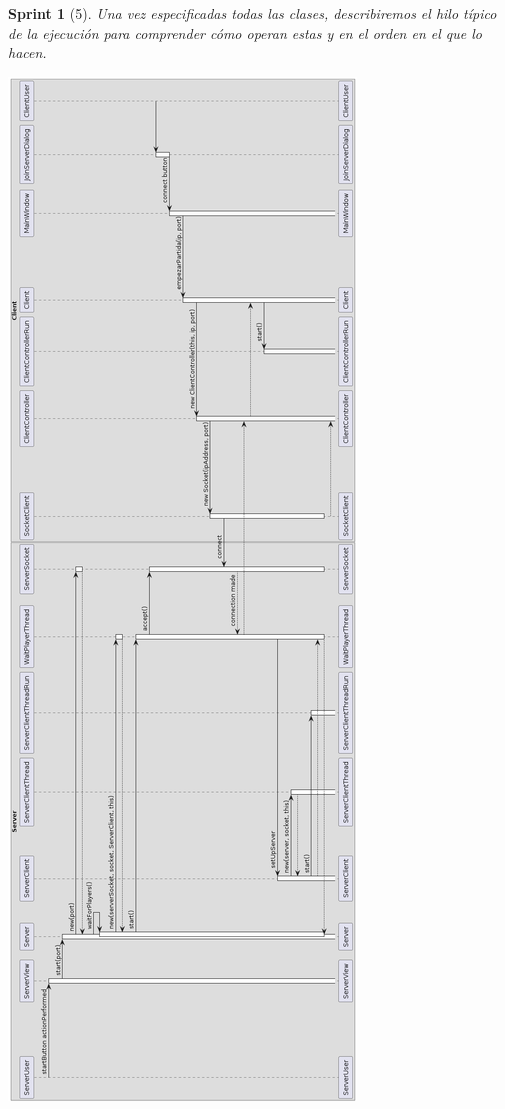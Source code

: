 \documentclass[12pt,a4paper,openright]{book}
\theoremstyle{break}
\newtheorem*{sprint}{Sprint}
\begin{document}
\begin{sprint}[5]
Una vez especificadas todas las clases, describiremos el hilo típico de la ejecución para comprender cómo operan estas y en el orden en el que lo hacen.

\begin{center}
\includegraphics[scale=0.4]{umlconexiones.png}
\end{center}


\end{sprint}
\end{document}
